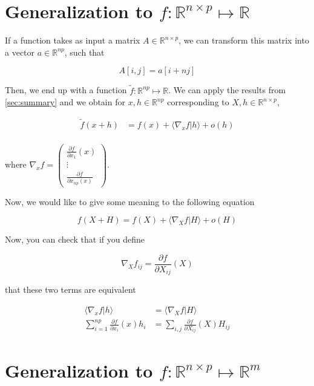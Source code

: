 \documentclass{tufte-handout}
\begin{document}
\section{Generalization to $ f : \mathbb{R}^{n \times p} \mapsto \mathbb{R} $}

If a function takes as input a matrix $ A \in \mathbb{R}^{n \times p} $, we can transform this matrix into a vector $ a \in \mathbb{R}^{np} $, such that 

$$ A[i, j] = a[i + nj] $$

Then, we end up with a function $ \tilde{f} : \mathbb{R}^{np} \mapsto \mathbb{R} $. We can apply the results from \ref{sec:summary} and we obtain for $ x, h \in \mathbb{R}^{np} $ corresponding to $ X, h \in \mathbb{R}^{n \times p} $, 

\begin{align*}
\tilde{f}(x + h) &= f(x) + \langle \nabla_x f | h \rangle + o(h) \\
\end{align*}

where $ \nabla_x f = \begin{pmatrix}
\frac{\partial f}{\partial x_1}(x) \\ \vdots \\ \frac{\partial f}{\partial x_{np}(x)}
\end{pmatrix} $. 

Now, we would like to give some meaning to the following equation


$$ f(X + H) = f(X) + \langle \nabla_X f | H \rangle + o(H) $$

Now, you can check that if you define

$$ \nabla_X f_{ij} = \frac{\partial f}{\partial X_{ij}}(X) $$



that these two terms are equivalent

\begin{align*}
\langle \nabla_x f | h \rangle &= \langle \nabla_X f | H \rangle \\
\sum_{i=1}^{np} \frac{\partial f}{\partial x_i}(x) h_i &= \sum_{i, j} \frac{\partial f}{\partial X_{ij}}(X) H_{ij}
\end{align*}

\section{Generalization to $ f : \mathbb{R}^{n \times p} \mapsto \mathbb{R}^m $}
\end{document}
